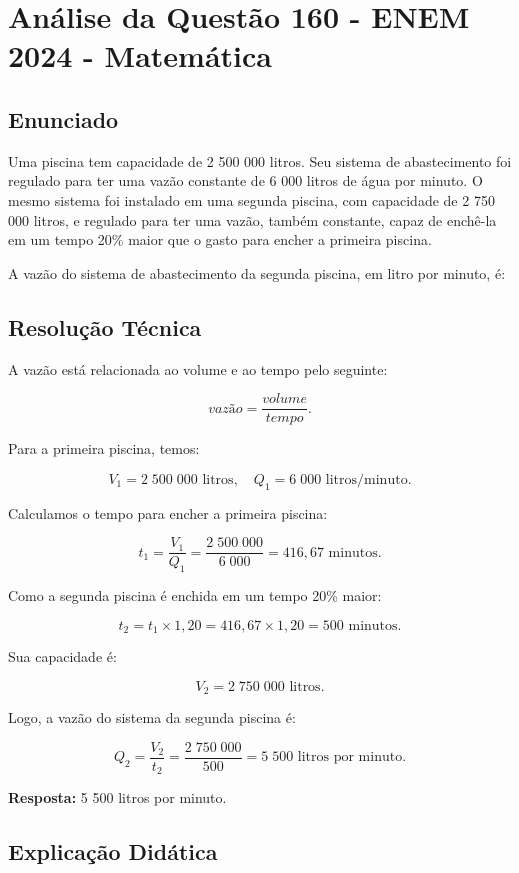 \documentclass{article}
\begin{document}
\section*{Análise da Questão 160 - ENEM 2024 - Matemática}

\subsection*{Enunciado}

Uma piscina tem capacidade de 2 500 000 litros. Seu sistema de abastecimento foi regulado para ter uma vazão constante de 6 000 litros de água por minuto. O mesmo sistema foi instalado em uma segunda piscina, com capacidade de 2 750 000 litros, e regulado para ter uma vazão, também constante, capaz de enchê-la em um tempo 20\% maior que o gasto para encher a primeira piscina.

A vazão do sistema de abastecimento da segunda piscina, em litro por minuto, é:

\subsection*{Resolução Técnica}

A vazão está relacionada ao volume e ao tempo pelo seguinte:

\[
vazão = \frac{volume}{tempo}.
\]

Para a primeira piscina, temos:

\[
  V_1 = 2\;500\;000 \text{ litros}, \quad Q_1 = 6\;000 \text{ litros/minuto}.
\]

Calculamos o tempo para encher a primeira piscina:

\[
  t_1 = \frac{V_1}{Q_1} = \frac{2\;500\;000}{6\;000} = 416,67 \text{ minutos}.
\]

Como a segunda piscina é enchida em um tempo 20\% maior:

\[
  t_2 = t_1 \times 1,20 = 416,67 \times 1,20 = 500 \text{ minutos}.
\]

Sua capacidade é:

\[
  V_2 = 2\;750\;000 \text{ litros}.
\]

Logo, a vazão do sistema da segunda piscina é:

\[
  Q_2 = \frac{V_2}{t_2} = \frac{2\;750\;000}{500} = 5\;500 \text{ litros por minuto}.
\]

\textbf{Resposta:} 5 500 litros por minuto.

\subsection*{Explicação Didática}
\end{document}
